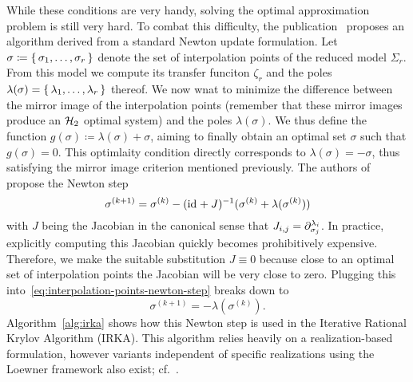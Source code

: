 While these conditions are very handy, solving the optimal approximation problem is still very hard.
To combat this difficulty, the publication~\cite{Gugercin2008} proposes an algorithm derived from a standard Newton update formulation.
Let $\sigma \coloneqq \sset{\sigma_1, \dots, \sigma_r}$ denote the set of interpolation points of the reduced model $\Sigma_r$.
From this model we compute its transfer funciton $\zeta_r$ and the poles $\lambda(\sigma) = \sset{\lambda_1, \dots, \lambda_r}$ thereof.
We now wnat to minimize the difference between the mirror image of the interpolation points (remember that these mirror images produce an $\mcl{H}_2$ optimal system) and the poles $\lambda(\sigma)$.
We thus define the function $g(\sigma) \coloneqq \lambda(\sigma) + \sigma$, aiming to finally obtain an optimal set $\sigma$ such that $g(\sigma) = 0$.
This optimlaity condition directly corresponds to $\lambda(\sigma) = -\sigma$, thus satisfying the mirror image criterion mentioned previously.
The authors of~\cite{Gugercin2008} propose the Newton step
\begin{equation}\label{eq:interpolation-points-newton-step}
    \sigma^{(k + 1)} = \sigma^{(k)} - (\id + J)\inv (\sigma^{(k)} + \lambda(\sigma^{(k)}))
\end{equation}
with $J$ being the Jacobian in the canonical sense that $J_{i, j} = \pd[\sigma_j]{\lambda_i}$.
In practice, explicitly computing this Jacobian quickly becomes prohibitively expensive.
Therefore, we make the suitable substitution $J \equiv 0$ because close to an optimal set of interpolation points the Jacobian will be very close to zero.
Plugging this into~\eqref{eq:interpolation-points-newton-step} breaks down to
\begin{equation*}
    \sigma^{(k + 1)} = - \lambda(\sigma^{(k)}).
\end{equation*}
Algorithm~\ref{alg:irka} shows how this Newton step is used in the Iterative Rational Krylov Algorithm (IRKA).
This algorithm relies heavily on a realization-based formulation, however variants independent of specific realizations using the Loewner framework also exist; cf.~\cite[Algorithm~7.2]{Beattie2017}.

